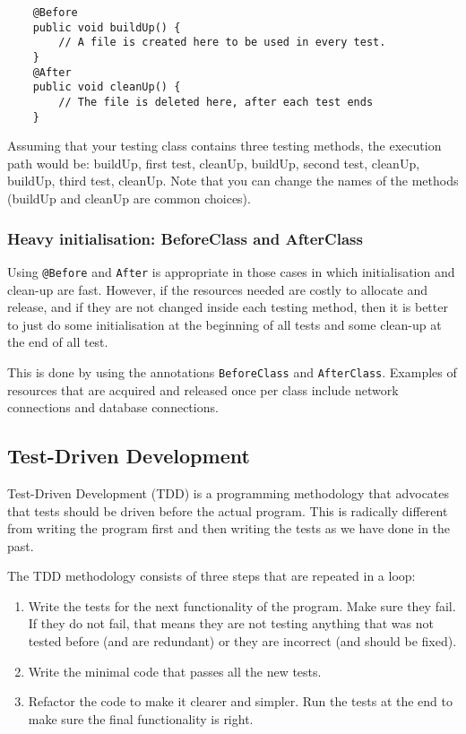 \begin{verbatim}
    @Before
    public void buildUp() {  
        // A file is created here to be used in every test. 
    }  
    @After
    public void cleanUp() {  
        // The file is deleted here, after each test ends
    }  
\end{verbatim}

Assuming that your testing class contains three testing methods, the
execution path would be: buildUp, first test, cleanUp, buildUp, second
test, cleanUp, buildUp, third test, cleanUp. Note that you can change
the names of the methods (buildUp and cleanUp are common choices).

\subsubsection{Heavy initialisation: BeforeClass and AfterClass}
\label{sec:heavy-init-befor}

Using \verb+@Before+ and \verb+After+ is appropriate in those cases in
which initialisation and clean-up are fast. However, if the resources
needed are costly to allocate and release, and if they are not changed
inside each testing method, then it is better to just do some
initialisation at the beginning of all tests and some clean-up at the
end of all test. 

This is done by using the annotations \verb+BeforeClass+ and
\verb+AfterClass+. Examples of resources that are acquired and
released once per class include network connections and database
connections. 


\subsection{Test-Driven Development}
\label{sec:test-driv-devel}

Test-Driven Development (TDD) is a programming methodology that advocates
that tests should be driven before the actual program. This is
radically different from writing the program first and then writing
the tests as we have done in the past.

The TDD methodology consists of three steps that are repeated in a
loop: 

\begin{enumerate}
\item Write the tests for the next functionality of the program. Make
  sure they fail. If they do not fail, that means they are not testing
  anything that was not tested before (and are redundant) or they are
  incorrect (and should be fixed). 
\item Write the minimal code that passes all the new tests.
\item Refactor the code to make it clearer and simpler. Run the tests
  at the end to make sure the final functionality is right. 
\end{enumerate}

